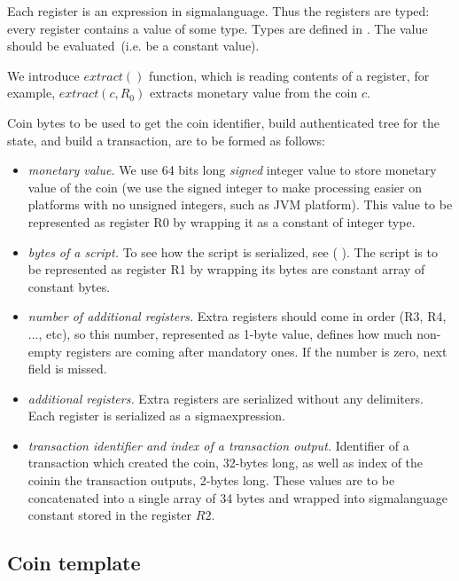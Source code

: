 \documentclass[]{article}   %
\newcommand{\authnote}[2]{\marginpar{\parbox{\marginparwidth}{\tiny %
  \textsf{#1 {\textcolor{blue}{notes: #2}}}}}%
  \textcolor{blue}{\textbf{\dag}}}
\newcommand{\authnote}[2]{
  \textsf{#1 \textcolor{blue}{: #2}}}
\newcommand{\authnote}[2]{}
\newcommand{\knote}[1]{{\authnote{\textcolor{green}{Alex notes}}{#1}}}
\newcommand{\coin}{coin}
\newcommand{\Coin}{Coin}
\newcommand{\sigm}{sigma}
\newcommand{\extract}[1]{$extract({#1})$}
\begin{document}
Each register is an expression in \sigm language. Thus the registers are typed: every register contains a value of
some type. Types are defined in \knote{ref}. The value should be evaluated~(i.e. be a constant value).

We introduce \extract{} function, which is reading contents of a register, for example, \extract{c, R_0} extracts monetary value
from the \coin{} $c$.

\Coin{} bytes to be used to get the \coin{} identifier, build authenticated tree for the state, and build a transaction,
are to be formed as follows:

\begin{itemize}
    \item{\em monetary value. } We use 64 bits long {\em signed} integer value to store monetary value of the \coin{}
    (we use the signed integer to make processing easier on platforms with no unsigned integers, such as JVM platform).
    This value to be represented as register R0 by wrapping it as a constant of integer type.
    \item{\em bytes of a script. } To see how the script is serialized, see (\knote{link to \sigm language expressions
    serialization}). The script is to be represented as register R1 by wrapping its bytes are constant array of constant
    bytes.
    \item{\em number of additional registers. } Extra registers should come in order (R3, R4, ..., etc), so this number,
    represented as 1-byte value, defines how much non-empty registers are coming after mandatory ones. If the number is
    zero, next field is missed.
    \item{\em additional registers. } Extra registers are serialized without any delimiters. Each register is
    serialized as a \sigm expression.
    \item{\em transaction identifier and index of a transaction output. } Identifier of a transaction which created
    the \coin{}, 32-bytes long, as well as index of the \coin in the transaction outputs, 2-bytes long. These values
    are to be concatenated into a single array of 34 bytes and wrapped into \sigm language constant stored in the
    register $R2$.
\end{itemize}



\subsection{\Coin{} template}
\label{coin-template}
\end{document}
